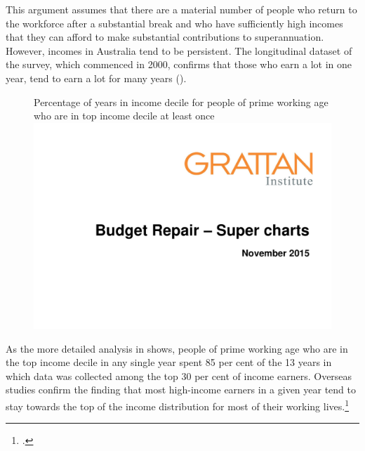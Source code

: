 This argument assumes that there are a material number of people who return to the workforce after a substantial break and who have sufficiently high incomes that they can afford to make substantial contributions to superannuation. However, incomes in Australia tend to be persistent. The longitudinal dataset of the \textcite{HILDA2015} survey, which commenced in 2000, confirms that those who earn a lot in one year, tend to earn a lot for many years ().
\begin{figure}
%
{Percentage of years in income decile for people of prime working age who are in top income decile at least once}\label{fig:SUPER-3-7}
\includegraphics[width=\columnwidth,page=16]{super-atlas/PPTX.pdf}

\end{figure}

As the more detailed analysis in  shows, people of prime working age who are in the top income decile in any single year spent 85 per cent of the 13 years in which data was collected among the top 30 per cent of income earners. Overseas studies confirm the finding that most high-income earners in a given year tend to stay towards the top of the income distribution for most of their working lives.\footcite[][56]{LevellRoantreeShaw2015}  

